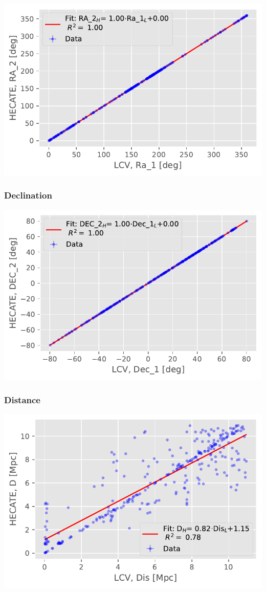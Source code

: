 \documentclass[
]{article}
\begin{document}
\includegraphics{compare_files/figure-pdf/cell-14-output-1.pdf}

\subsubsection{Declination}

\includegraphics{compare_files/figure-pdf/cell-15-output-1.pdf}

\subsubsection{Distance}

\includegraphics{compare_files/figure-pdf/cell-16-output-1.pdf}
\end{document}
